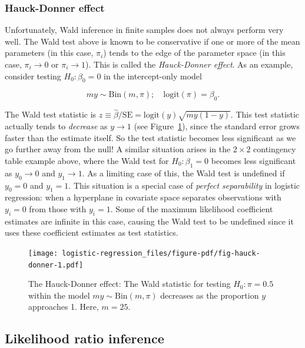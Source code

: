\documentclass[
  11pt,
  letterpaper,
  oneside]{book}
\theoremstyle{plain}
\theoremstyle{plain}
\theoremstyle{definition}
\theoremstyle{definition}
\theoremstyle{plain}
\theoremstyle{remark}
\begin{document}
\hypertarget{sec-hauck-donner-effect}{%
\subsubsection{Hauck-Donner effect}\label{sec-hauck-donner-effect}}

Unfortunately, Wald inference in finite samples does not always perform
very well. The Wald test above is known to be conservative if one or
more of the mean parameters (in this case, \(\pi_i\)) tends to the edge
of the parameter space (in this case, \(\pi_i \rightarrow 0\) or
\(\pi_i \rightarrow 1\)). This is called the \emph{Hauck-Donner effect}.
As an example, consider testing \(H_0: \beta_0 = 0\) in the
intercept-only model

\[
my \sim \text{Bin}(m, \pi); \quad \text{logit}(\pi) = \beta_0.
\]

The Wald test statistic is
\(z \equiv \widehat \beta/\text{SE} = \text{logit}(y)\sqrt{my(1-y)}\).
This test statistic actually tends to \emph{decrease} as
\(y \rightarrow 1\) (see Figure~\ref{fig-hauck-donner}), since the
standard error grows faster than the estimate itself. So the test
statistic becomes less significant as we go further away from the null!
A similar situation arises in the \(2 \times 2\) contingency table
example above, where the Wald test for \(H_0: \beta_1 = 0\) becomes less
significant as \(y_0 \rightarrow 0\) and \(y_1 \rightarrow 1\). As a
limiting case of this, the Wald test is undefined if \(y_0 = 0\) and
\(y_1 = 1\). This situation is a special case of \emph{perfect
separability} in logistic regression: when a hyperplane in covariate
space separates observations with \(y_i = 0\) from those with
\(y_i = 1\). Some of the maximum likelihood coefficient estimates are
infinite in this case, causing the Wald test to be undefined since it
uses these coefficient estimates as test statistics.

\begin{figure}

{\centering \texttt{[image: logistic-regression\_files/figure-pdf/fig-hauck-donner-1.pdf]}

}

\caption{\label{fig-hauck-donner}The Hauck-Donner effect: The Wald
statistic for testing \(H_0: \pi = 0.5\) within the model
\(my \sim \text{Bin}(m, \pi)\) decreases as the proportion \(y\)
approaches 1. Here, \(m = 25\).}

\end{figure}

\hypertarget{sec-likelihood-ratio-inference}{%
\subsection{Likelihood ratio
inference}\label{sec-likelihood-ratio-inference}}
\end{document}
